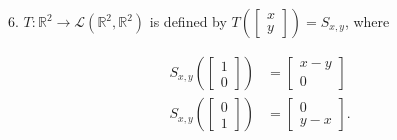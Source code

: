 \documentclass{article}
\begin{document}
6. $T : \mathbb{R}^2 \to \mathcal{L}(\mathbb{R}^2, \mathbb{R}^2)$ is defined by $T\left(\left[\begin{array}{c} x \\ y \end{array}\right]\right) = S_{x, y}$, where

\begin{align*}
	S_{x, y}\left( \left[\begin{array}{c} 1 \\ 0 \end{array}\right] \right) &= \left[\begin{array}{c} x - y \\ 0 \end{array}\right]\\
	S_{x, y}\left( \left[\begin{array}{c} 0 \\ 1 \end{array}\right] \right) &= \left[\begin{array}{c} 0 \\ y - x \end{array}\right].
\end{align*}
\end{document}
